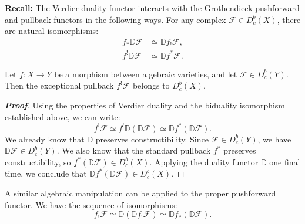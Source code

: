 \textbf{Recall:} The Verdier duality functor interacts with the Grothendieck pushforward and pullback functors in the following ways. For any complex $\mathcal{F} \in D^b_c(X)$, there are natural isomorphisms:
\begin{align*}
    f_* \mathbb{D} \mathcal{F} &\simeq \mathbb{D} f_! \mathcal{F}, \\
    f^! \mathbb{D} \mathcal{F} &\simeq \mathbb{D} f^* \mathcal{F}.
\end{align*}

\begin{proposition}
Let $f \colon X \longrightarrow Y$ be a morphism between algebraic varieties, and let $\mathcal{F} \in D^b_c(Y)$. Then the exceptional pullback $f^! \mathcal{F}$ belongs to $D^b_c(X)$.
\end{proposition}

\begin{proof}[\textbf{Proof}]
Using the properties of Verdier duality and the biduality isomorphism established above, we can write:
\begin{equation*}
    f^! \mathcal{F} \simeq f^! \mathbb{D}(\mathbb{D}\mathcal{F}) \simeq \mathbb{D} f^* (\mathbb{D} \mathcal{F}).
\end{equation*}
We already know that $\mathbb{D}$ preserves constructibility. Since $\mathcal{F} \in D^b_c(Y)$, we have $\mathbb{D}\mathcal{F} \in D^b_c(Y)$. We also know that the standard pullback $f^*$ preserves constructibility, so $f^* (\mathbb{D} \mathcal{F}) \in D^b_c(X)$. Applying the duality functor $\mathbb{D}$ one final time, we conclude that $\mathbb{D} f^* (\mathbb{D} \mathcal{F}) \in D^b_c(X)$. 
\end{proof}

\begin{remark}
A similar algebraic manipulation can be applied to the proper pushforward functor. We have the sequence of isomorphisms:
\begin{equation*}
    f_! \mathcal{F} \simeq \mathbb{D}(\mathbb{D} f_! \mathcal{F}) \simeq \mathbb{D} f_* (\mathbb{D} \mathcal{F}).
\end{equation*}
\end{remark}